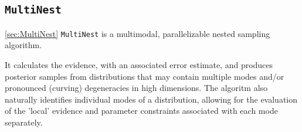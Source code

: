 

\subsection{\texttt{MultiNest}}
\ref{sec:MultiNest}
\texttt{MultiNest} is a multimodal, parallelizable nested sampling algorithm. 

It calculates the evidence, with an associated error estimate, and produces posterior samples from distributions that may contain multiple modes and/or pronounced (curving) degeneracies in high dimensions. The algoritm also naturally identifies individual modes of a distribution, allowing for the evaluation of the 'local' evidence and parameter constraints associated with each mode separately.

